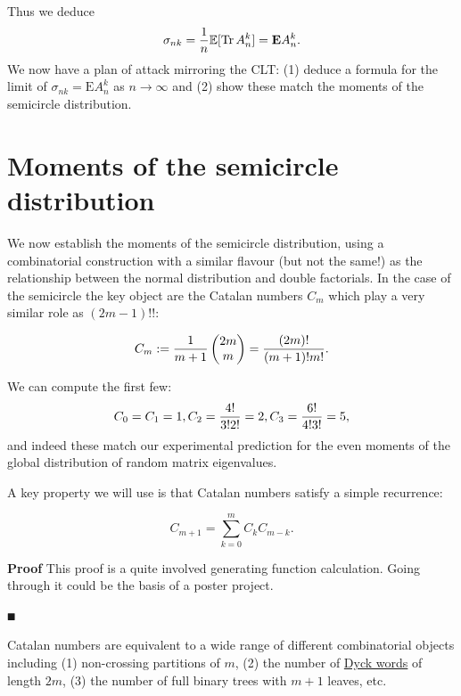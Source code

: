 Thus we deduce
\[
\sigma_{nk} = {1 \over n} {\mathbb E}[{\rm Tr}\, A_n^k] = \bm{\mathrm{E}} A_n^k.
\]
We now have a plan of attack mirroring the CLT: (1) deduce a formula for the limit of $\ensuremath{\sigma}_{nk} = \ensuremath{\bm{\mathrm{E}}} A_n^k$ as $n \ensuremath{\rightarrow} \ensuremath{\infty}$ and (2) show these match the moments of the semicircle distribution.

\section{Moments of the semicircle distribution}
We now establish the moments of the semicircle distribution, using a combinatorial construction with a similar flavour (but not the same!) as the relationship between the normal distribution and double factorials. In the case of the semicircle the key object are the Catalan numbers $C_m$ which play a very similar role as $(2m-1)!!$:

\begin{definition}
\[
C_m := {1 \over m+1} \begin{pmatrix} 2m \\ m \end{pmatrix} =  {(2m)! \over (m+1)! m!}.
\]
\end{definition}

We can compute the first few:
\[
C_0 = C_1 = 1, C_2 = {4! \over 3! 2!} = 2, C_3 = {6! \over 4!3!} = 5,
\]
and indeed these match our experimental prediction for the even moments of the global distribution of random matrix eigenvalues. 

A key property we will use is that Catalan numbers satisfy a simple recurrence:

\begin{lemma}
\[
C_{m+1} = \ensuremath{\sum}_{k=0}^m C_k C_{m-k}.
\]
\end{lemma}
\textbf{Proof} This proof is a quite involved generating function calculation. Going through it could be the basis of a poster project.

\ensuremath{\QED}

Catalan numbers are equivalent to a wide range of different combinatorial objects including (1) non-crossing partitions of $m$, (2) the number of \href{https://en.wikipedia.org/wiki/Dyck_language}{Dyck words} of length $2m$, (3) the number of full binary trees with $m+1$ leaves, etc.

